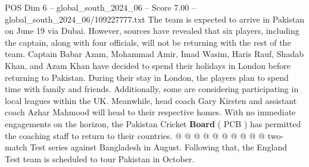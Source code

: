\begin{textsample}{POS Dim 6 – global\_south\_2024\_06 – Score 7.00 – global\_south\_2024\_06/109227777.txt}
The team is expected to arrive in Pakistan on June 19 via Dubai.
However, sources have revealed that six players, including the captain, along with four officials, will not be returning with the rest of the team.
Captain Babar Azam, Mohammad Amir, Imad Wasim, Haris Rauf, Shadab Khan, and Azam Khan have decided to spend their holidays in London before returning to Pakistan.
During their stay in London, the players plan to spend time with family and friends.
Additionally, some are considering participating in local leagues within the UK.
Meanwhile, head coach Gary Kirsten and assistant coach Azhar Mahmood will head to their respective homes.
With no immediate engagements on the horizon, the Pakistan Cricket \textbf{Board} ( PCB ) has permitted the coaching staff to return to their countries. @ @ @ @ @ @ @ @ @ @ two-match Test series against Bangladesh in August.
Following that, the England Test team is scheduled to tour Pakistan in October.

\end{textsample}
